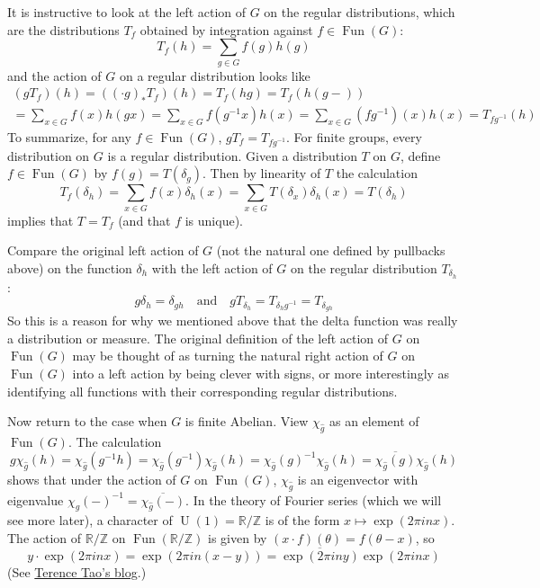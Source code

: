 \documentclass[11pt,leqno]{article}
\theoremstyle{plain}
\theoremstyle{definition}
\numberwithin{equation}{section}
\numberwithin{lem}{section}
\DeclareMathOperator{\Fun}{Fun}
\DeclareMathOperator{\U}{U}
\begin{document}
It is instructive to look at the left action of $G$ on the regular distributions, which are the distributions $T_f$ obtained by integration against $f\in\Fun(G)$:
\[T_f(h) = \sum_{g\in G}f(g)h(g)\]
and the action of $G$ on a regular distribution looks like
\begin{multline*}
	(gT_f)(h) = ((\cdot g)_\ast T_f)(h) = T_f(hg) = T_f(h(g-)) \\ = \sum_{x\in G} f(x)h(gx) = \sum_{x\in G} f(g^{-1}x)h(x) = \sum_{x\in G} (fg^{-1})(x)h(x) = T_{fg^{-1}}(h)
\end{multline*}
To summarize, for any $f\in \Fun(G)$, $gT_f = T_{fg^{-1}}$. For finite groups, every distribution on $G$ is a regular distribution. Given a distribution $T$ on $G$, define $f\in \Fun(G)$ by $f(g) = T(\delta_g)$. Then by linearity of $T$ the calculation
\[T_f(\delta_h) = \sum_{x\in G}f(x)\delta_h(x) = \sum_{x\in G}T(\delta_x)\delta_h(x) = T(\delta_h)\]
implies that $T = T_f$ (and that $f$ is unique).

Compare the original left action of $G$ (not the natural one defined by pullbacks above) on the function $\delta_h$ with the left action of $G$ on the regular distribution $T_{\delta_h}$:
\[g\delta_h = \delta_{gh}\quad \text{and}\quad gT_{\delta_h} = T_{\delta_hg^{-1}} = T_{\delta_{gh}}\]
So this is a reason for why we mentioned above that the delta function was really a distribution or measure. The original definition of the left action of $G$ on $\Fun(G)$ may be thought of as turning the natural right action of $G$ on $\Fun(G)$ into a left action by being clever with signs, or more interestingly as identifying all functions with their corresponding regular distributions.

Now return to the case when $G$ is finite Abelian. View $\chi_{\hat g}$ as an element of $\Fun(G)$. The calculation
\[g\chi_{\hat g}(h) = \chi_{\hat g}(g^{-1}h) = \chi_{\hat g}(g^{-1})\chi_{\hat g}(h) =\chi_{\hat g}(g)^{-1}\chi_{\hat g}(h) = \overline{\chi_{\hat g}(g)}\chi_{\hat g}(h)\]
shows that under the action of $G$ on $\Fun(G)$, $\chi_{\hat g}$ is an eigenvector with eigenvalue $\chi_{\hat g}(-)^{-1} = \overline{\chi_{\hat g}(-)}$. In the theory of Fourier series (which we will see more later), a character of $\U(1) = \mathbb R/\mathbb Z$ is of the form $x\mapsto \exp(2\pi inx)$. The action of $\mathbb R/\mathbb Z$ on $\Fun(\mathbb R/\mathbb Z)$ is given by $(x\cdot f)(\theta) = f(\theta-x)$, so
\[y\cdot\exp(2\pi inx) = \exp(2\pi in(x-y)) = \overline{\exp(2\pi i n y)}\exp(2\pi inx)\]
(See \href{https://terrytao.wordpress.com/2009/04/06/the-fourier-transform/#more-2015}{Terence Tao's blog}.)
\end{document}
